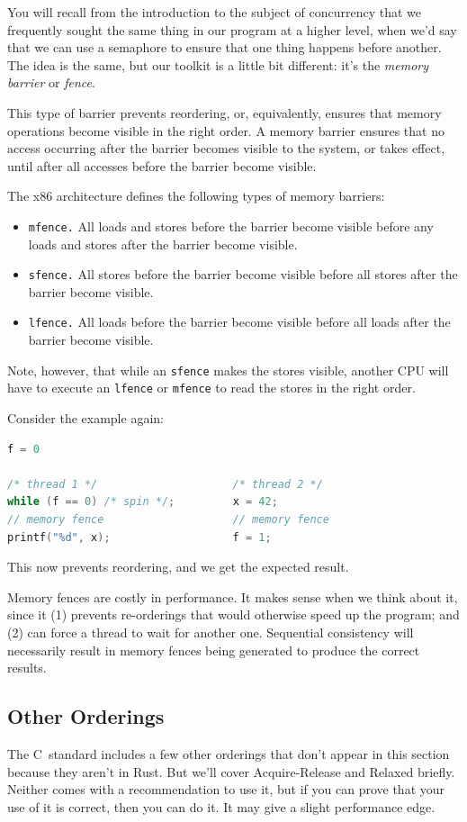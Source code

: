 \documentclass[a4paper]{report}
\newcommand{\CPP}{C\nolinebreak\hspace{-.05em}\raisebox{.4ex}{\tiny\bf +}\nolinebreak\hspace{-.10em}\raisebox{.4ex}{\tiny\bf +}}
\def\CPP{{C\nolinebreak[4]\hspace{-.05em}\raisebox{.4ex}{\tiny\bf ++}}}
\begin{document}
You will recall from the introduction to the subject of concurrency that we frequently sought the same thing in our program at a higher level, when we'd say that we can use a semaphore to ensure that one thing happens before another. The idea is the same, but our toolkit is a little bit different: it's the \emph{memory barrier} or
\emph{fence}. 

This type of barrier prevents reordering, or,
equivalently, ensures that memory operations become visible in the
right order. A memory barrier ensures that no access occurring after
the barrier becomes visible to the system, or takes effect, until
after all accesses before the barrier become visible.


The x86 architecture defines the following types of memory 
barriers:

\begin{itemize}
\item {\tt mfence.} All loads and stores before the barrier become
visible before any loads and stores after the barrier become visible.
\item {\tt sfence.} All stores before the barrier become visible before
all stores after the barrier become visible.
\item {\tt lfence.} All loads before the barrier become visible before
all loads after the barrier become visible.
\end{itemize}

Note, however, that while an {\tt sfence} makes the stores visible,
another CPU will have to execute an {\tt lfence} or {\tt mfence} to
read the stores in the right order.

Consider the example again:
  \begin{lstlisting}[language=C]
                         f = 0

/* thread 1 */                     /* thread 2 */
while (f == 0) /* spin */;         x = 42;
// memory fence                    // memory fence
printf("%d", x);                   f = 1;
  \end{lstlisting}
This now prevents reordering, and we get the expected result.

Memory fences are costly in performance. It makes sense when we think about it, since it (1) prevents re-orderings that would otherwise speed up the program; and (2) can force a thread to wait for another one. Sequential consistency will necessarily result in memory fences being generated to produce the correct results. 

\subsection*{Other Orderings}
The \CPP~standard includes a few other orderings that don't appear in this section because they aren't in Rust. But we'll cover Acquire-Release and Relaxed briefly. Neither comes with a recommendation to use it, but if you can prove that your use of it is correct, then you can do it. It may give a slight performance edge.
\end{document}
